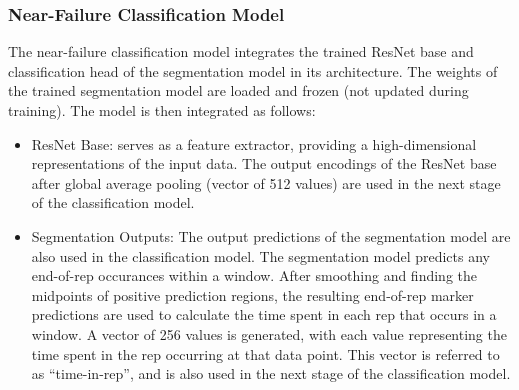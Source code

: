 \documentclass[conference]{IEEEtran}
\begin{document}
\subsubsection{Near-Failure Classification Model}
The near-failure classification model integrates the trained ResNet base and classification head of the segmentation model in its architecture. The weights of the trained segmentation model are loaded and frozen (not updated during training). The model is then integrated as follows:
\begin{itemize}
    \item ResNet Base: serves as a feature extractor, providing a high-dimensional representations of the input data. The output encodings of the ResNet base after global average pooling (vector of 512 values) are used in the next stage of the classification model.
    \item Segmentation Outputs: The output predictions of the segmentation model are also used in the classification model. The segmentation model predicts any end-of-rep occurances within a window. After smoothing and finding the midpoints of positive prediction regions, the resulting end-of-rep marker predictions are used to calculate the time spent in each rep that occurs in a window. A vector of 256 values is generated, with each value representing the time spent in the rep occurring at that data point. This vector is referred to as ``time-in-rep'', and is also used in the next stage of the classification model.
\end{itemize}
\end{document}
